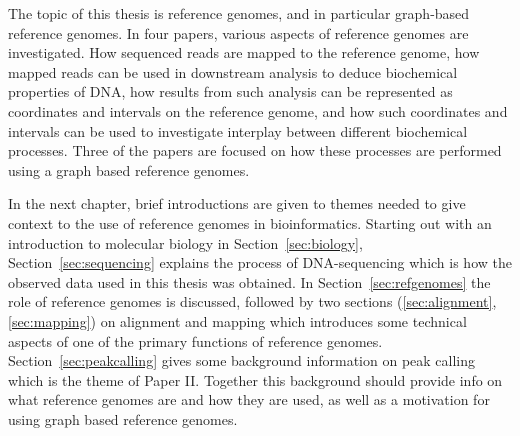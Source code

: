 The topic of this thesis is reference genomes, and in particular graph-based reference genomes.
In four papers, various aspects of reference genomes are investigated. 
How sequenced reads are mapped to the reference genome, how mapped reads can be used in downstream analysis to deduce biochemical properties of DNA, how results from such analysis can be represented as coordinates and intervals on the reference genome, and how such coordinates and intervals can be used to investigate interplay between different biochemical processes.
Three of the papers are focused on how these processes are performed using a graph based reference genomes.

In the next chapter, brief introductions are given to themes needed to give context to the use of reference genomes in bioinformatics.
Starting out with an introduction to molecular biology in Section~\ref{sec:biology}, Section~\ref{sec:sequencing} explains the process of DNA-sequencing which is how the observed data used in this thesis was obtained.
In Section~\ref{sec:refgenomes} the role of reference genomes is discussed, followed by two sections (\ref{sec:alignment}, \ref{sec:mapping}) on alignment and mapping which introduces some technical aspects of one of the primary functions of reference genomes. Section~\ref{sec:peakcalling} gives some background information on peak calling which is the theme of Paper II. 
Together this background should provide info on what reference genomes are and how they are used, as well as a motivation for using graph based reference genomes.
% 
% 
% 
% 
% 


